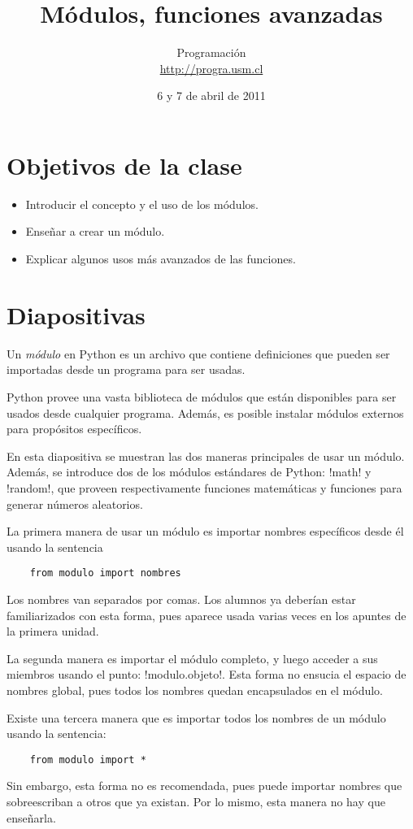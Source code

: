 \documentclass[10pt]{article}
\title{Módulos, funciones avanzadas}
\author{Programación \\ \url{http://progra.usm.cl}}
\date{6 y 7 de abril de 2011}
\begin{document}
  \maketitle

  \section*{Objetivos de la clase}
  \begin{itemize}
    \item Introducir el concepto y el uso de los módulos.
    \item Enseñar a crear un módulo.
    \item Explicar algunos usos más avanzados de las funciones.
  \end{itemize}

  \section*{Diapositivas}


  Un \emph{módulo} en Python
  es un archivo que contiene definiciones
  que pueden ser importadas desde un programa para ser usadas.

  Python provee una vasta biblioteca de módulos
  que están disponibles para ser usados desde cualquier programa.
  Además, es posible instalar módulos externos
  para propósitos específicos.

  En esta diapositiva
  se muestran las dos maneras principales de usar un módulo.
  Además, se introduce dos de los módulos estándares de Python: \li!math! y \li!random!,
  que proveen respectivamente funciones matemáticas y funciones para generar números aleatorios.

  La primera manera de usar un módulo
  es importar nombres específicos desde él
  usando la sentencia
  \begin{lstlisting}
    from modulo import nombres
  \end{lstlisting}
  Los nombres van separados por comas.
  Los alumnos ya deberían estar familiarizados con esta forma,
  pues aparece usada varias veces en los apuntes de la primera unidad.

  La segunda manera es importar el módulo completo,
  y luego acceder a sus miembros usando el punto:
  \li!modulo.objeto!.
  Esta forma no ensucia el espacio de nombres global,
  pues todos los nombres quedan encapsulados en el módulo.

  Existe una tercera manera que es importar todos los nombres de un módulo
  usando la sentencia:
  \begin{lstlisting}
    from modulo import *
  \end{lstlisting}
  Sin embargo, esta forma no es recomendada,
  pues puede importar nombres que sobreescriban a otros que ya existan.
  Por lo mismo, esta manera no hay que enseñarla.
\end{document}

